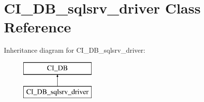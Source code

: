 \hypertarget{class_c_i___d_b__sqlsrv__driver}{\section{C\-I\-\_\-\-D\-B\-\_\-sqlsrv\-\_\-driver Class Reference}
\label{class_c_i___d_b__sqlsrv__driver}
}
Inheritance diagram for C\-I\-\_\-\-D\-B\-\_\-sqlsrv\-\_\-driver\-:\begin{figure}[H]
\begin{center}
\leavevmode
\includegraphics[height=2.000000cm]{class_c_i___d_b__sqlsrv__driver}
\end{center}
\end{figure}

